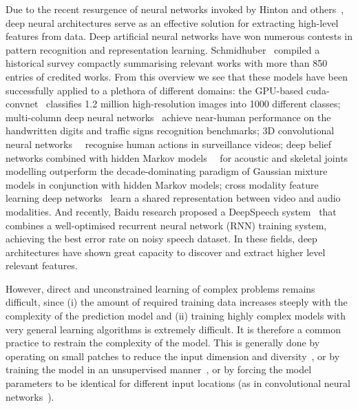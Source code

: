 Due to the recent resurgence of neural networks invoked by Hinton and others~\cite{hinton2006fast}, deep neural architectures serve as an effective solution for extracting high-level features from data.
Deep artificial neural networks have won numerous contests in pattern recognition and representation learning. Schmidhuber~\cite{schmidhuber2014deep} compiled a historical survey compactly summarising relevant works with more than 850 entries of credited works.
From this overview we see that these models have been successfully applied to a plethora of different domains: the GPU-based cuda-convnet~\cite{krizhevsky2012imagenet} classifies 1.2 million high-resolution images into 1000 different classes; multi-column deep neural networks~\cite{ciresan2012multi} achieve near-human performance on the handwritten digits and traffic signs recognition benchmarks; 3D convolutional neural networks~\cite{3dcnn}~\cite{ji20133d} recognise human actions in surveillance videos; deep belief networks combined with hidden Markov models~\cite{mohamed2012acoustic}~\cite{diwucvpr14} for acoustic and skeletal joints modelling outperform the decade-dominating paradigm of Gaussian mixture models in conjunction with hidden Markov models; cross modality feature learning deep networks~\cite{ngiam2011multimodal} learn a shared representation between video and audio modalities. 
And recently, Baidu research proposed a DeepSpeech system~\cite{hannun2014deepspeech} that combines a well-optimised recurrent neural network (RNN) training system, achieving the best error rate on noisy speech dataset. In these fields, deep architectures have shown great capacity to discover and extract higher level relevant features.

However, direct and unconstrained learning of complex problems remains difficult, since (i) the amount of required training data increases steeply with the complexity of the prediction model and (ii) training highly complex models with very general learning algorithms is extremely difficult. It is therefore a common practice to restrain the complexity of the model. This is generally done by operating on small patches to reduce the input dimension and diversity~\cite{baccouche2005spatio}, or by training the model in an unsupervised manner~\cite{le2011learning}, or by forcing the model parameters to be identical for different input locations (as in convolutional neural networks~\cite{krizhevsky2012imagenet,ciresan2012multi,3dcnn}).


